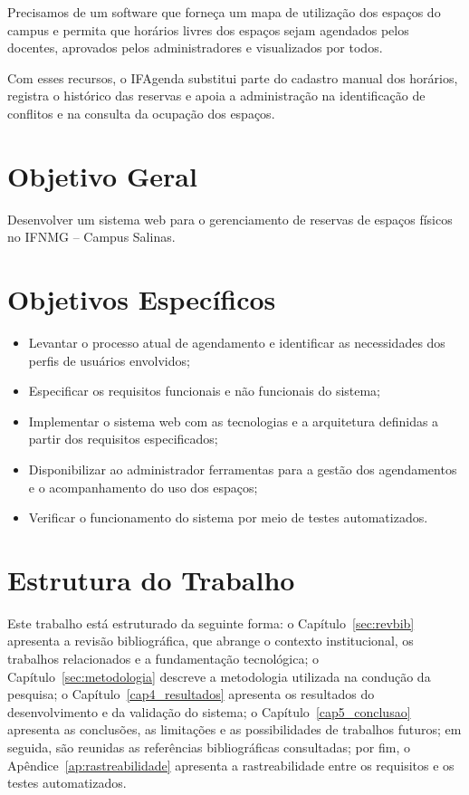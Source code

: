 \begin{citacao}
Precisamos de um software que forneça um mapa de utilização dos espaços do campus e permita que horários livres dos espaços sejam agendados pelos docentes, aprovados pelos administradores e visualizados por todos.
\end{citacao}

Com esses recursos, o IFAgenda substitui parte do cadastro manual dos horários, registra o histórico das reservas e apoia a administração na identificação de conflitos e na consulta da ocupação dos espaços.
\section{Objetivo Geral}
\label{sec:objetivoGeral}
Desenvolver um sistema web para o gerenciamento de reservas de espaços físicos no IFNMG -- Campus Salinas.
\section{Objetivos Específicos}
\label{sec:objetivosEspecificos}
\begin{itemize}
    \item Levantar o processo atual de agendamento e identificar as necessidades dos perfis de usuários envolvidos;
    \item Especificar os requisitos funcionais e não funcionais do sistema;
    \item Implementar o sistema web com as tecnologias e a arquitetura definidas a partir dos requisitos especificados;
    \item Disponibilizar ao administrador ferramentas para a gestão dos agendamentos e o acompanhamento do uso dos espaços;
    \item Verificar o funcionamento do sistema por meio de testes automatizados.
\end{itemize}
\section{Estrutura do Trabalho}
\label{sec:estruturaTrabalho}
Este trabalho está estruturado da seguinte forma: o Capítulo~\ref{sec:revbib} apresenta a revisão bibliográfica, que abrange o contexto institucional, os trabalhos relacionados e a fundamentação tecnológica; o Capítulo~\ref{sec:metodologia} descreve a metodologia utilizada na condução da pesquisa; o Capítulo~\ref{cap4_resultados} apresenta os resultados do desenvolvimento e da validação do sistema; o Capítulo~\ref{cap5_conclusao} apresenta as conclusões, as limitações e as possibilidades de trabalhos futuros; em seguida, são reunidas as referências bibliográficas consultadas; por fim, o Apêndice~\ref{ap:rastreabilidade} apresenta a rastreabilidade entre os requisitos e os testes automatizados.
